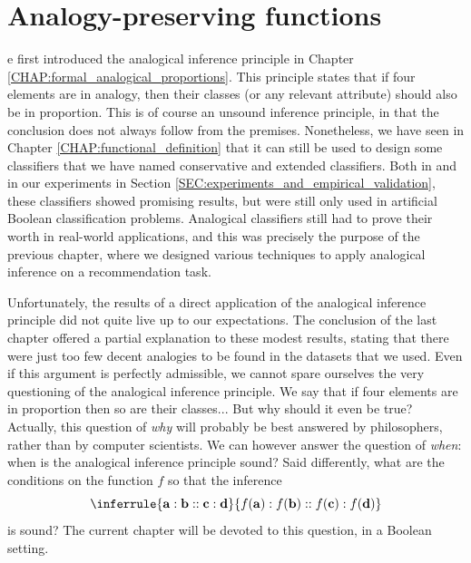 \chapter{Analogy-preserving functions}
\label{CHAP:analogy_preserving_functions}
\localtableofcontents*
\vspace*{\baselineskip}

e first introduced the analogical inference principle in Chapter
\ref{CHAP:formal_analogical_proportions}. This principle states that if four
elements are in analogy, then their classes (or any relevant attribute) should
also be in proportion. This is of course an unsound inference principle, in
that the conclusion does not always follow from the premises. Nonetheless, we
have seen in Chapter \ref{CHAP:functional_definition} that it can still be used
to design some classifiers that we have named conservative and extended
classifiers.  Both in \cite{BayMicDelIJCAI07} and in our experiments in Section
\ref{SEC:experiments_and_empirical_validation}, these classifiers
showed promising results, but were still only used in artificial Boolean
classification problems. Analogical classifiers still had to prove their worth
in real-world applications, and this was precisely the purpose of the previous
chapter, where we designed various techniques to apply analogical inference on
a recommendation task.

Unfortunately, the results of a direct application of the analogical inference
principle did not quite live up to our expectations. The conclusion of the last
chapter offered a partial explanation to these modest results, stating that
there were just too few decent analogies to be found in the datasets that we
used. Even if this argument is perfectly admissible, we cannot spare ourselves
the very questioning of the analogical inference principle. We say that if
four elements are in proportion then so are their classes... But why should it
even be true? Actually, this question of \textit{why} will probably be best
answered by philosophers, rather than by computer scientists. We can however
answer the question of \textit{when}: when is the analogical inference
principle sound? Said differently, what are the conditions on the function $f$
so that the inference
$$
\inferrule{\mathbf{a} : \mathbf{b} :: \mathbf{c} : \mathbf{d}}{ f(\mathbf{a}) :
f(\mathbf{b}) :: f(\mathbf{c}) : f(\mathbf{d})}
$$
is sound? The current chapter will be devoted to this question, in a Boolean
setting.

